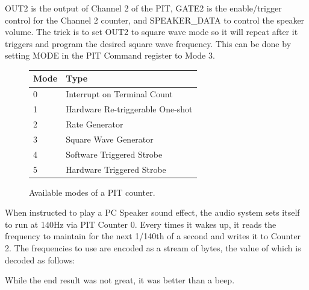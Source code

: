 \documentclass[book.tex]{subfiles}
\begin{document}
OUT2 is the output of Channel 2 of the PIT, GATE2 is the enable/trigger control for the Channel 2 counter, and SPEAKER\_DATA to control the speaker volume. The trick is to set OUT2 to square wave mode so it will repeat after it triggers and program the desired square wave frequency. This can be done by setting MODE in the PIT Command register to Mode 3.\\
\par
\begin{figure}[H]
\centering
   \begin{tabularx}{\textwidth}{ X X  }
	  \toprule
	  \textbf{Mode} & \textbf{Type} \\ \bottomrule
	    0 & Interrupt on Terminal Count\\
		1 & Hardware Re-triggerable One-shot\\
		2 & Rate Generator\\
		3 & Square Wave Generator\\
		4 & Software Triggered Strobe\\
		5 & Hardware Triggered Strobe\\
	  \bottomrule
  \end{tabularx}
  \caption{Available modes of a PIT counter.}
\end{figure}
\par 
When instructed to play a PC Speaker sound effect, the audio system sets itself to run at 140Hz via PIT Counter 0. Every times it wakes up, it reads the frequency to maintain for the next 1/140th of a second and writes it to Counter 2. The frequencies to use are encoded as a stream of bytes, the value of which is decoded as follows:\\
\par 
\begin{minipage}{\textwidth}

\end{minipage}
\par

While the end result was not great, it was better than a beep.\\

\par
\begin{minipage}{\textwidth}

\end{minipage}
\par
\end{document}
